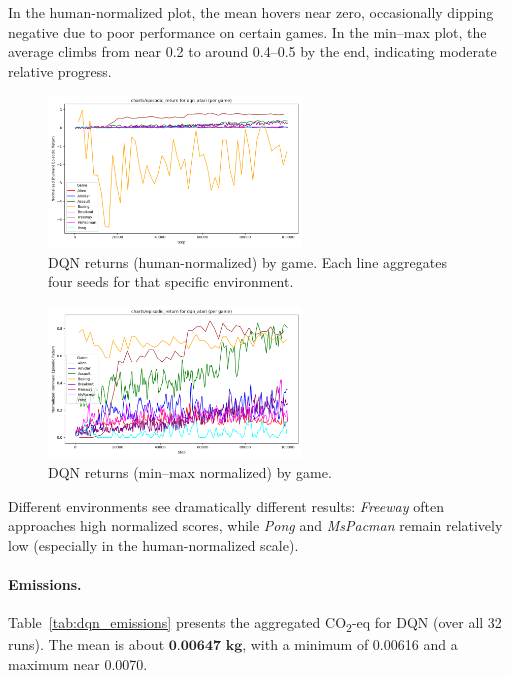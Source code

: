 In the human-normalized plot, the mean hovers near zero, 
occasionally dipping negative due to poor performance on certain games. 
In the min--max plot, the average climbs from near 0.2 to around 0.4--0.5 by the end, 
indicating moderate relative progress.

\begin{figure}[htbp]
	\centering
	\includegraphics[width=0.6\textwidth]{figures/dqn/charts_episodic_return_per_game_human_dqn_atari.png}
	\caption{DQN returns (human-normalized) by game. Each line aggregates 
		four seeds for that specific environment.}
	\label{fig:dqn_return_pergame_human}
\end{figure}

\begin{figure}[htbp]
	\centering
	\includegraphics[width=0.6\textwidth]{figures/dqn/charts_episodic_return_per_game_minmax_dqn_atari.png}
	\caption{DQN returns (min--max normalized) by game.}
	\label{fig:dqn_return_pergame_minmax}
\end{figure}

Different environments see dramatically different results: 
\emph{Freeway} often approaches high normalized scores, while 
\emph{Pong} and \emph{MsPacman} remain relatively low 
(especially in the human-normalized scale).

\paragraph{Emissions.}
Table~\ref{tab:dqn_emissions} presents the aggregated CO\textsubscript{2}-eq for DQN 
(over all 32 runs). The mean is about \(\textbf{0.00647 kg}\), 
with a minimum of 0.00616 and a maximum near 0.0070.


